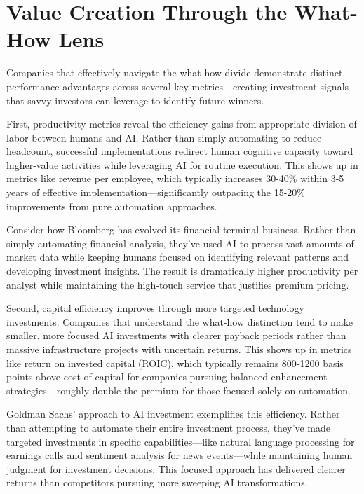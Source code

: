 \documentclass[
  Letterpaper,
]{scrbook}
\begin{document}
\section{Value Creation Through the What-How
Lens}\label{value-creation-through-the-what-how-lens}

Companies that effectively navigate the what-how divide demonstrate
distinct performance advantages across several key metrics---creating
investment signals that savvy investors can leverage to identify future
winners.

First, productivity metrics reveal the efficiency gains from appropriate
division of labor between humans and AI. Rather than simply automating
to reduce headcount, successful implementations redirect human cognitive
capacity toward higher-value activities while leveraging AI for routine
execution. This shows up in metrics like revenue per employee, which
typically increases 30-40\% within 3-5 years of effective
implementation---significantly outpacing the 15-20\% improvements from
pure automation approaches.

Consider how Bloomberg has evolved its financial terminal business.
Rather than simply automating financial analysis, they've used AI to
process vast amounts of market data while keeping humans focused on
identifying relevant patterns and developing investment insights. The
result is dramatically higher productivity per analyst while maintaining
the high-touch service that justifies premium pricing.

Second, capital efficiency improves through more targeted technology
investments. Companies that understand the what-how distinction tend to
make smaller, more focused AI investments with clearer payback periods
rather than massive infrastructure projects with uncertain returns. This
shows up in metrics like return on invested capital (ROIC), which
typically remains 800-1200 basis points above cost of capital for
companies pursuing balanced enhancement strategies---roughly double the
premium for those focused solely on automation.

Goldman Sachs' approach to AI investment exemplifies this efficiency.
Rather than attempting to automate their entire investment process,
they've made targeted investments in specific capabilities---like
natural language processing for earnings calls and sentiment analysis
for news events---while maintaining human judgment for investment
decisions. This focused approach has delivered clearer returns than
competitors pursuing more sweeping AI transformations.
\end{document}
